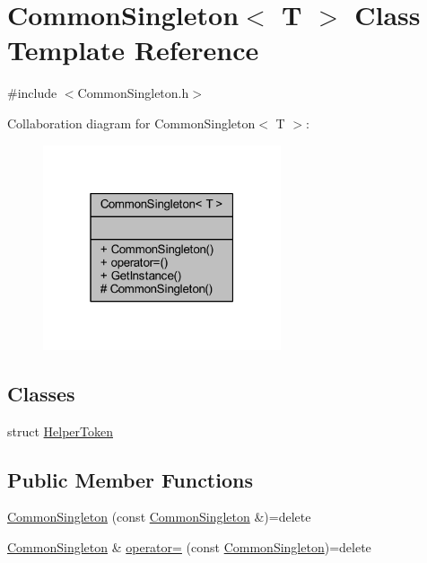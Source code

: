 \hypertarget{class_common_singleton}{}\section{Common\+Singleton$<$ T $>$ Class Template Reference}
\label{class_common_singleton}


{\ttfamily \#include $<$Common\+Singleton.\+h$>$}



Collaboration diagram for Common\+Singleton$<$ T $>$\+:
\nopagebreak
\begin{figure}[H]
\begin{center}
\leavevmode
\includegraphics[width=199pt]{class_common_singleton__coll__graph}
\end{center}
\end{figure}
\subsection*{Classes}
\begin{DoxyCompactItemize}
\item 
struct \mbox{\hyperlink{struct_common_singleton_1_1_helper_token}{Helper\+Token}}
\end{DoxyCompactItemize}
\subsection*{Public Member Functions}
\begin{DoxyCompactItemize}
\item 
\mbox{\hyperlink{class_common_singleton_a00a83433e7f0b2895e436a8426ff5044}{Common\+Singleton}} (const \mbox{\hyperlink{class_common_singleton}{Common\+Singleton}} \&)=delete
\item 
\mbox{\hyperlink{class_common_singleton}{Common\+Singleton}} \& \mbox{\hyperlink{class_common_singleton_a4f30b3cc1365df03a07b04cb4095d6f0}{operator=}} (const \mbox{\hyperlink{class_common_singleton}{Common\+Singleton}})=delete
\end{DoxyCompactItemize}

